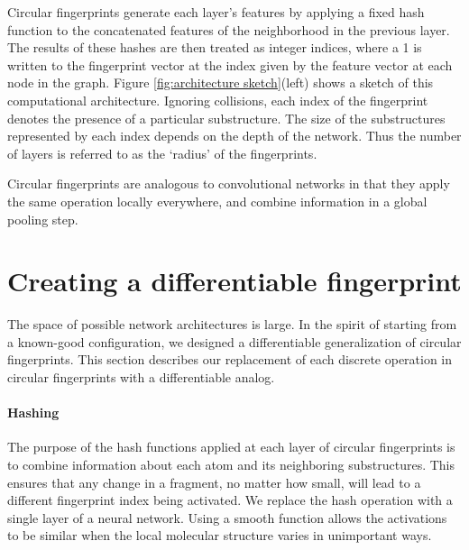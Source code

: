 \documentclass{article}
\begin{document}
Circular fingerprints generate each layer's features by applying a fixed hash function to the concatenated features of the neighborhood in the previous layer.
The results of these hashes are then treated as integer indices, where a 1 is written to the fingerprint vector at the index given by the feature vector at each node in the graph.
Figure \ref{fig:architecture sketch}(left) shows a sketch of this computational architecture.
Ignoring collisions, each index of the fingerprint denotes the presence of a particular substructure.
The size of the substructures represented by each index depends on the depth of the network.
Thus the number of layers is referred to as the `radius' of the fingerprints.


Circular fingerprints are analogous to convolutional networks in that they apply the same operation locally everywhere,  and combine information in a global pooling step.

\section{Creating a differentiable fingerprint}
\vspace{-3mm}
The space of possible network architectures is large.
In the spirit of starting from a known-good configuration, we designed a differentiable generalization of circular fingerprints.
This section describes our replacement of each discrete operation in circular fingerprints with a differentiable analog.

\paragraph{Hashing}
The purpose of the hash functions applied at each layer of circular fingerprints is to combine information about each atom and its neighboring substructures.
This ensures that any change in a fragment, no matter how small, will lead to a different fingerprint index being activated.
We replace the hash operation with a single layer of a neural network.
Using a smooth function allows the activations to be similar when the local molecular structure varies in unimportant ways.
\end{document}
